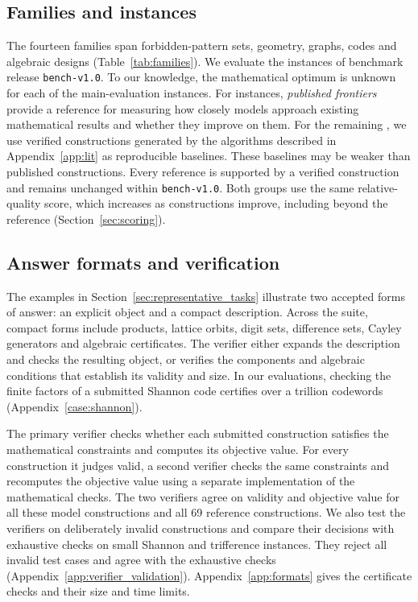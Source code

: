 \documentclass{article}
\begin{document}
\subsection{Families and instances}
\label{sec:tiers}
The fourteen families span forbidden-pattern sets, geometry, graphs, codes and algebraic designs (Table~\ref{tab:families}). We evaluate the \DistinctN{} instances of benchmark release \texttt{bench-v1.0}. To our knowledge, the mathematical optimum is unknown for each of the \DistinctN{} main-evaluation instances. For \PanelOneN{} instances, \emph{published frontiers} provide a reference for measuring how closely models approach existing mathematical results and whether they improve on them. For the remaining \PanelTwoN{}, we use verified constructions generated by the algorithms described in Appendix~\ref{app:lit} as reproducible baselines. These baselines may be weaker than published constructions. Every reference is supported by a verified construction and remains unchanged within \texttt{bench-v1.0}. Both groups use the same relative-quality score, which increases as constructions improve, including beyond the reference (Section~\ref{sec:scoring}).



\subsection{Answer formats and verification}
\label{sec:formats}
The examples in Section~\ref{sec:representative_tasks} illustrate two accepted forms of answer: an explicit object and a compact description. Across the suite, compact forms include products, lattice orbits, digit sets, difference sets, Cayley generators and algebraic certificates. The verifier either expands the description and checks the resulting object, or verifies the components and algebraic conditions that establish its validity and size. In our evaluations, checking the finite factors of a submitted Shannon code certifies over a trillion codewords (Appendix~\ref{case:shannon}).

The primary verifier checks whether each submitted construction satisfies the mathematical constraints and computes its objective value. For every construction it judges valid, a second verifier checks the same constraints and recomputes the objective value using a separate implementation of the mathematical checks. The two verifiers agree on validity and objective value for all these model constructions and all 69 reference constructions. We also test the verifiers on deliberately invalid constructions and compare their decisions with exhaustive checks on small Shannon and trifference instances. They reject all invalid test cases and agree with the exhaustive checks (Appendix~\ref{app:verifier_validation}). Appendix~\ref{app:formats} gives the certificate checks and their size and time limits.
\end{document}
